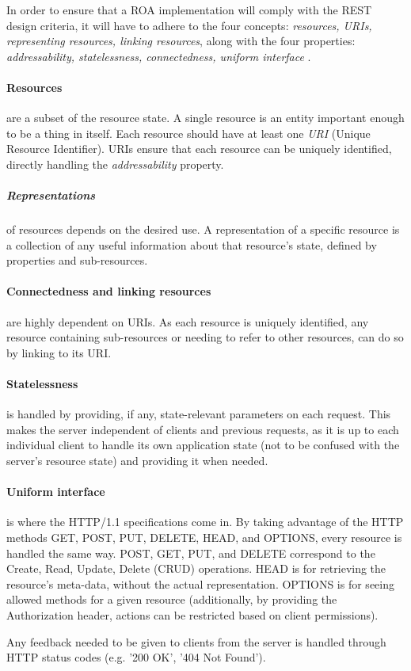 In order to ensure that a ROA implementation will comply with the REST design criteria, it will have to adhere to the four concepts: \textit{resources, URIs, representing resources, linking resources}, along with the four properties: \textit{addressability, statelessness, connectedness, uniform interface} \cite[Chapter 4]{restful_web_services}.

\paragraph{Resources} are a subset of the resource state.
A single resource is an entity important enough to be a thing in itself.
Each resource should have at least one \textit{URI} (Unique Resource Identifier).
URIs ensure that each resource can be uniquely identified, directly handling the \textit{addressability} property.

\subparagraph{Representations} of resources depends on the desired use.
A representation of a specific resource is a collection of any useful information about that resource's state, defined by properties and sub-resources.

\paragraph{Connectedness and linking resources} are highly dependent on URIs.
As each resource is uniquely identified, any resource containing sub-resources or needing to refer to other resources, can do so by linking to its URI.

\paragraph{Statelessness} is handled by providing, if any, state-relevant parameters on each request.
This makes the server independent of clients and previous requests, as it is up to each individual client to handle its own application state (not to be confused with the server's resource state) and providing it when needed.

\paragraph{Uniform interface} is where the HTTP/1.1 specifications come in.
By taking advantage of the HTTP methods GET, POST, PUT, DELETE, HEAD, and OPTIONS, every resource is handled the same way.
POST, GET, PUT, and DELETE correspond to the Create, Read, Update, Delete (CRUD) operations.
HEAD is for retrieving the resource's meta-data, without the actual representation.
OPTIONS is for seeing allowed methods for a given resource (additionally, by providing the Authorization header, actions can be restricted based on client permissions).

Any feedback needed to be given to clients from the server is handled through HTTP status codes (e.g. '200 OK', '404 Not Found').
